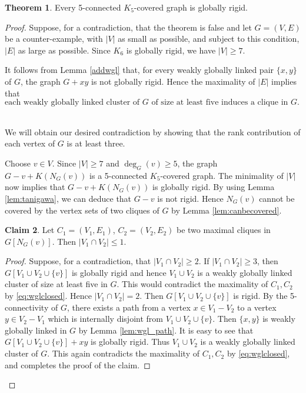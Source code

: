\documentclass[11pt,a4paper]{article}
\theoremstyle{definition}
\newtheorem{theorem}{Theorem}[section]
\newtheorem{claim}[theorem]{Claim}
\begin{document}
\begin{theorem}\label{thm:5c5c:GR}
    Every 5-connected $K_5$-covered graph is globally rigid. 
\end{theorem}

\begin{proof}
    Suppose, for a contradiction, that the theorem is false and 
    let $G=(V,E)$ be a counter-example, 
    with $|V|$ as small as possible, and subject to this condition, $|E|$ as
    large as possible. Since $K_6$ is globally rigid,
    we have $|V|\geq 7$.
    
    It follows from Lemma \ref{addwgl}
    that, for every weakly globally linked pair $\{x,y\}$ of $G$,
    the graph $G+xy$
    is not
    globally rigid. Hence
    the maximality of $|E|$ implies that
    \begin{equation}\label{eq:wglclosed}
        \mbox{
            each 
            weakly globally linked cluster of $G$ of size at least five induces a clique in $G$.
        }
    \end{equation}\
    
        
    \noindent
    We will obtain our desired contradiction by showing that the rank contribution of each vertex of $G$ is at least three.
    
    Choose $v\in V$. Since $|V|\geq 7$ and $\deg_G(v)\geq 5$, the graph $G-v+K(N_G(v))$ is a 5-connected $K_5$-covered graph.
    The minimality of $|V|$ now implies that $G-v+K(N_G(v))$ is globally rigid. By using
    Lemma \ref{lem:tanigawa}, we can deduce that $G-v$ is not rigid.
    Hence $N_G(v)$ cannot be 
    covered by the vertex sets of two cliques of $G$ by Lemma \ref{lem:canbecovered}.
    
    \begin{claim}
        \label{claim1}
        Let $C_1=(V_1,E_1)$, $C_2=(V_2,E_2)$ be two maximal cliques in $G[N_G(v)]$.
        Then $|V_1\cap V_2|\leq 1$.
    \end{claim}
    
    \begin{proof}
    Suppose, for a contradiction, that $|V_1\cap V_2|\geq 2$. If	$|V_1\cap V_2|\geq 3$,
        then $G[V_1\cup V_2\cup\{v\}]$ is globally rigid 
        and hence $V_1\cup V_2$ is a weakly globally linked cluster of
        size at least five in $G$. This would contradict the maximality of $C_1,C_2$ by \eqref{eq:wglclosed}. 
        Hence $|V_1\cap V_2|=2$. Then $G[V_1\cup V_2\cup \{v\}]$ is  rigid. By the 5-connectivity of $G$, there exists a path from 
        a vertex $x\in V_1-V_2$ to a vertex $y\in V_2-V_1$ 
        which is internally disjoint from $V_1\cup V_2\cup \{v\}$.
        Then $\{x,y\}$ is weakly globally linked in $G$ by Lemma \ref{lem:wgl_path}.
        It is easy to see that $G[V_1\cup V_2\cup \{v\}]+xy$ is globally rigid. Thus $V_1\cup V_2$ is a weakly globally linked cluster of $G$. 
        This again contradicts the maximality of $C_1,C_2$ by \eqref{eq:wglclosed}, and completes the proof of the claim.
    \end{proof}
    

\end{proof}
\end{document}
